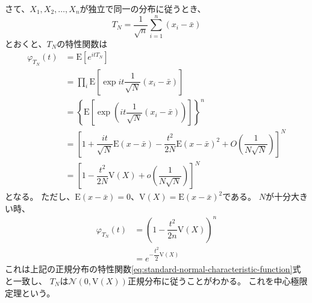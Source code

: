 \documentclass[../../../main]{subfiles}
\begin{document}
さて、$X_1, X_2, \ldots, X_n$が独立で同一の分布に従うとき、
\begin{equation}
    T_N = \dfrac{1}{\sqrt{n}} \sum_{i=1}^{n} (x_i - \bar{x})
\end{equation}
とおくと、$T_N$の特性関数は
\begin{align*}
    \varphi_{T_N}(t) & = \mathrm{E}\left[e^{itT_N}\right]                                                                                                                  \\
                     & = \prod_i \mathrm{E}\left[\exp{it\dfrac{1}{\sqrt{N}}(x_i - \bar{x})}\right]                                                                         \\
                     & = \left\{\mathrm{E}\left[\exp\left(it\dfrac{1}{\sqrt{N}}\left(x_i - \bar{x}\right)\right)\right]\right\}^n                                          \\
                     & = \left[1 + \dfrac{it}{\sqrt{N}} \mathrm{E}(x - \bar{x}) - \dfrac{t^2}{2N} \mathrm{E}(x - \bar{x})^2 + O\left(\dfrac{1}{N\sqrt{N}}\right) \right]^N \\
                     & = \left[1 - \dfrac{t^2}{2N}\mathrm{V}(X) + o\left(\dfrac{1}{N\sqrt{N}}\right)\right]^N
\end{align*}
となる。
ただし、$\mathrm{E}(x - \bar{x}) = 0$、$\mathrm{V}(X) = \mathrm{E}(x - \bar{x})^2$である。
$N$が十分大きい時、
\begin{align}
    \varphi_{T_N}(t) & = \left( 1 - \dfrac{t^2}{2n}\mathrm{V}(X) \right)^n \nonumber \\
                     & = e^{-\dfrac{t^2}{2}\mathrm{V}(X)}
\end{align}
これは上記の正規分布の特性関数\ref{eq:standard-normal-characteristic-function}式と一致し、
$T_N$は$\mathcal{N}(0, \mathrm{V}(X))$正規分布に従うことがわかる。
これを中心極限定理という。


\clearpage

\end{document}
